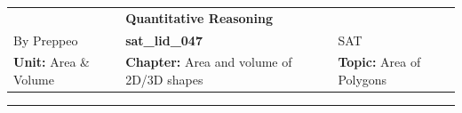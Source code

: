 \documentclass[11pt,paper=a4,answers]{exam}
\begin{document}
\begin{center}
    \centering
    \renewcommand{\arraystretch}{1.5}
    \begin{tabularx}{\textwidth}{YYY}
    & \normalsize\bf{{\Large{{Quantitative Reasoning}}}} & \\
    By Preppeo & \normalsize\bf{{sat\_lid\_047}} & SAT\\
    \normalsize{{\textbf{{Unit:}} Area \& Volume}} & \normalsize{{\textbf{{Chapter:}} Area and volume of 2D/3D shapes}} & \normalsize{{\textbf{{Topic:}} Area of Polygons}} \\
    \end{tabularx}
\end{center}
\par\noindent\rule{\textwidth}{1pt}
\end{document}
